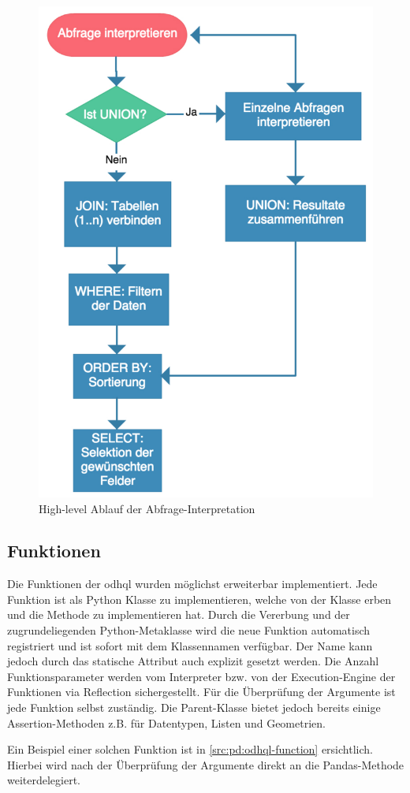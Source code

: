 \begin{figure}[H]
\centering
\includegraphics[width=0.6\linewidth]{fig/odhql-flow.pdf}
\caption{High-level Ablauf der Abfrage-Interpretation}
\label{fig:pd:odhql-flow}
\end{figure}


\subsection{Funktionen}
Die Funktionen der \acs{odhql} wurden möglichst erweiterbar implementiert. Jede Funktion ist als Python Klasse zu implementieren, welche von der Klasse  erben und die Methode  zu implementieren hat. Durch die Vererbung und der zugrundeliegenden Python-Metaklasse wird die neue Funktion automatisch registriert und ist sofort mit dem Klassennamen verfügbar. Der Name kann jedoch durch das statische Attribut  auch explizit gesetzt werden. Die Anzahl Funktionsparameter werden vom Interpreter bzw. von der Execution-Engine der Funktionen via Reflection sichergestellt. Für die Überprüfung der Argumente ist jede Funktion selbst zuständig. Die Parent-Klasse bietet jedoch bereits einige Assertion-Methoden z.B. für Datentypen, Listen und Geometrien.

Ein Beispiel einer solchen Funktion ist in \cref{src:pd:odhql-function} ersichtlich. Hierbei wird nach der Überprüfung der Argumente direkt an die Pandas-Methode  weiterdelegiert.


